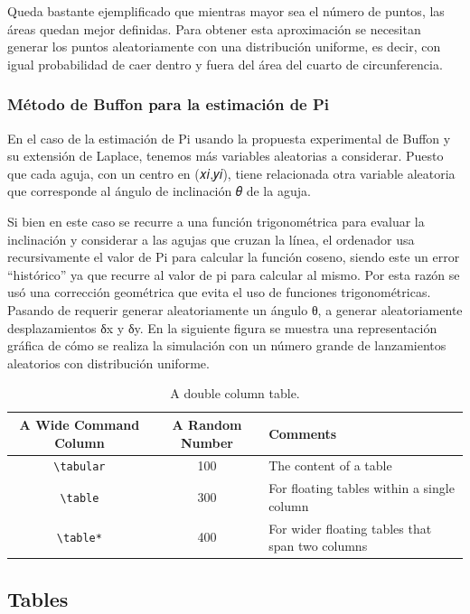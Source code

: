 \documentclass[sigconf, nonacm]{acmart}
\begin{document}
Queda bastante ejemplificado que mientras mayor sea el número de puntos, las áreas quedan mejor definidas.
Para obtener esta aproximación se necesitan generar los puntos aleatoriamente con una distribución uniforme, es decir, con igual probabilidad de caer dentro y fuera del área del cuarto de circunferencia.

\subsubsection{Método de Buffon para la estimación de Pi}

En el caso de la estimación de Pi usando la propuesta experimental de Buffon y su extensión de Laplace, tenemos más variables aleatorias a considerar. Puesto que cada aguja, con un centro en (𝑥𝑖,𝑦𝑖), tiene relacionada otra variable aleatoria que corresponde al ángulo de inclinación 𝜃 de la aguja.

Si bien en este caso se recurre a una función trigonométrica para evaluar la inclinación y considerar a las agujas que cruzan la línea, el ordenador usa recursivamente el valor de Pi para calcular la función coseno, siendo este un error “histórico” ya que recurre al valor de pi para calcular al mismo. Por esta razón se usó una corrección geométrica que evita el uso de funciones trigonométricas.
Pasando de requerir generar aleatoriamente un ángulo θ, a generar aleatoriamente desplazamientos δx y δy. En la siguiente figura se muestra una representación gráfica de cómo se realiza la simulación con un número grande de lanzamientos aleatorios con distribución uniforme.


\begin{table}[t]
  \caption{A double column table.}
  \label{tab:commands}
  \begin{tabular}{ccl}
    \toprule
    A Wide Command Column & A Random Number & Comments\\
    \midrule
    \verb|\tabular| & 100& The content of a table \\
    \verb|\table|  & 300 & For floating tables within a single column\\
    \verb|\table*| & 400 & For wider floating tables that span two columns\\
    \bottomrule
  \end{tabular}
\end{table}

\subsection{Tables}
\end{document}
